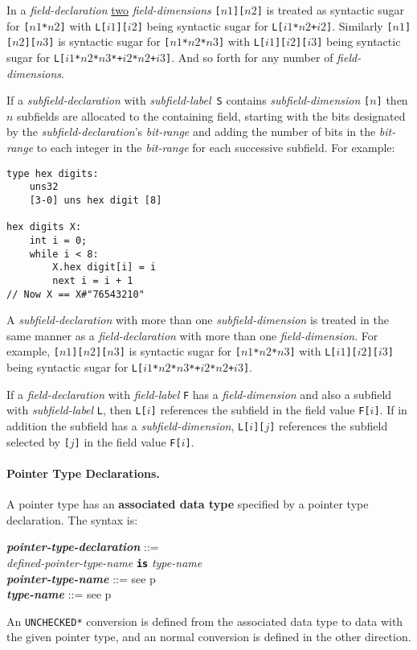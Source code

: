 \documentclass[12pt]{article}
\newcommand{\subsubsubsection}[1]{\paragraph[#1]{#1.}}
\newcommand{\TT}[1]{{\tt \bfseries #1}}
\newcommand{\key}[1]{{\rm \bfseries #1}}
\newcommand{\ttkey}[1]{{\tt \bfseries #1}}
\newcommand{\emkey}[1]{{\em \bfseries #1}}
\newcommand{\pagref}[1]{p\pageref{#1}}
\newcommand{\EOL}{\penalty \exhyphenpenalty}
\newenvironment{indpar}[1][0.3in]%
	{\begin{list}{}%
		     {\setlength{\itemsep}{0in}%
		      \setlength{\topsep}{0in}%
		      \setlength{\parsep}{1ex}%
		      \setlength{\labelwidth}{#1}%
		      \setlength{\leftmargin}{#1}%
		      \addtolength{\leftmargin}{\labelsep}}%
	 \item}%
	{\end{list}}
\begin{document}
In a {\em field-declaration}
\underline{two} {\em field-dimensions} {\tt [$n1$][$n2$]} is
treated as syntactic sugar for {\tt [$n1$*$n2$]} with
{\tt L[$i1$][$i2$]} being syntactic sugar for
{\tt L[$i1$*$n2$+$i2$]}.  Similarly
{\tt [$n1$][$n2$][$n3$]} is
syntactic sugar for {\tt [$n1$*$n2$*$n3$]} with
{\tt L[$i1$][$i2$][$i3$]} being syntactic sugar for
{\tt L[$i1$*$n2$*$n3$*+$i2$*$n2$+$i3$]}.  And so forth for any
number of {\em field-dimensions}.

If a {\em subfield-declaration} with {\em subfield-label}\, {\tt S} contains 
{\em subfield-dimension} {\tt [$n$]} then $n$ subfields are
allocated to the containing field, starting with the bits
designated by the {\em subfield-declaration}'s {\em bit-range}
and adding the number of bits in the {\em bit-range} to each integer
in the {\em bit-range} for each successive subfield.
For example:

\begin{indpar}\begin{verbatim}
type hex digits:
    uns32
    [3-0] uns hex digit [8]

hex digits X:
    int i = 0;
    while i < 8:
        X.hex digit[i] = i
        next i = i + 1
// Now X == X#"76543210"
\end{verbatim}\end{indpar}

A {\em subfield-declaration} with more than one {\em subfield-dimension} is
treated in the same manner as a {\em field-declaration} with
more than one {\em field-dimension}.  For example,
{\tt [$n1$][$n2$][$n3$]} is
syntactic sugar for {\tt [$n1$*$n2$*$n3$]} with
{\tt L[$i1$][$i2$][$i3$]} being syntactic sugar for
{\tt L[$i1$*$n2$*$n3$*+\EOL $i2$*$n2$+\EOL $i3$]}.

If a {\em field-declaration} with {\em field-label} {\tt F}
has a {\em field-dimension}
and also a subfield with {\em subfield-label} {\tt L}, then
{\tt L[$i$]} references the subfield in the field value {\tt F[$i$]}.
If in addition the subfield has a {\em subfield-dimension},
{\tt L[$i$][$j$]} references the subfield selected by {\tt [$j$]}
in the field value {\tt F[$i$]}.


\subsubsubsection{Pointer Type Declarations}
\label{POINTER-TYPE-DECLARATIONS}

A pointer type has an
\key{associated data type}\label{POINTER-ASSOCIATE}
specified by a pointer type declaration.  The syntax is:

\begin{indpar}
\emkey{pointer-type-declaration}\label{POINTER-TYPE-DECLARATION} ::= \\
\hspace*{0.5in}\ttkey{pointer type} {\em defined-pointer-type-name}
	       \TT{is} {\em type-name}
\\[0.5ex]
\emkey{pointer-type-name} ::= see \pagref{POINTER-TYPE-NAME}
\\[0.5ex]
\emkey{type-name} ::= see \pagref{TYPE-NAME}
\end{indpar}
An {\tt *UNCHECKED*} conversion is defined from the associated data
type to data with the given pointer type, and an normal conversion
is defined in the other direction.
\end{document}
